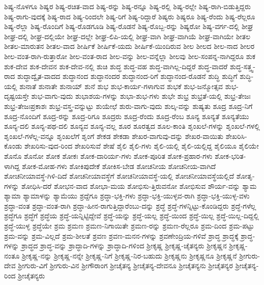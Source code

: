 {ಶಿಷ್ಯ-ನೊಳಗೂ
ಶಿಷ್ಯರ
ಶಿಷ್ಯ-ರಚಿತ-ವಾದ
ಶಿಷ್ಯ-ರನ್ನು
ಶಿಷ್ಯ-ರನ್ನೂ
ಶಿಷ್ಯ-ರಲ್ಲಿ
ಶಿಷ್ಯ-ರಲ್ಲೇ
ಶಿಷ್ಯ-ರಾಗಿ-ಬಿಡುತ್ತಿದ್ದರು
ಶಿಷ್ಯ-ರಾಗು-ವುದಕ್ಕೆ
ಶಿಷ್ಯ-ರಾದ
ಶಿಷ್ಯ-ರಿಂದಲೇ
ಶಿಷ್ಯ-ರಿಗೆ
ಶಿಷ್ಯ-ರಿದ್ದಾರೆ
ಶಿಷ್ಯರು
ಶಿಷ್ಯರೂ
ಶಿಷ್ಯ-ರೆಂದು
ಶಿಷ್ಯ-ರೆಲ್ಲರೂ
ಶಿಷ್ಯ-ರೆಲ್ಲಾ
ಶಿಷ್ಯ-ರೊಂದಿಗೆ
ಶಿಷ್ಯ-ರೊಡಗೂಡಿ
ಶಿಷ್ಯ-ರೊಡನೆ
ಶಿಷ್ಯ-ರೊಬ್ಬ-ರನ್ನು
ಶಿಷ್ಯರೋ
ಶಿಷ್ಯ-ವರ್ಗ-ದಲ್ಲಿ
ಶೀಘ್ರ
ಶೀಘ್ರ-ದಲ್ಲಿ
ಶೀಘ್ರ-ದಲ್ಲಿಯೇ
ಶೀಘ್ರ-ದಲ್ಲೇ
ಶೀಘ್ರ-ಲಿಪಿ-ಯಲ್ಲಿ
ಶೀಘ್ರ-ವಾಗಿ
ಶೀಘ್ರ-ವಾಗಿಯೆ
ಶೀಘ್ರ-ವಾಗಿಯೇ
ಶೀತಲ
ಶೀತಲ-ಮಾರುತನ
ಶೀತಲ-ವಾದ
ಶೀರ್ಷಿಕೆ
ಶೀರ್ಷಿಕೆ-ಯದು
ಶೀರ್ಷಿಕೆ-ಯಿಂದಿರುವ
ಶೀಲ
ಶೀಲದ
ಶೀಲ-ನಾದ
ಶೀಲರ
ಶೀಲ-ವಂತ-ರಾಗಿ-ರುತ್ತಾರೋ
ಶೀಲ-ವಂತ-ರಾದ
ಶೀಲ-ವನ್ನು
ಶೀಲ-ವನ್ನೆಲ್ಲಾ
ಶೀಲವು
ಶೀಲ-ಸಂಪನ್ನ-ನಾಗಿದ್ದರೂ
ಶುಕ
ಶುಕ-ದೇವ
ಶುಕ-ದೇವನ
ಶುಕ-ದೇವ-ನಲ್ಲಿ
ಶುಚಿ
ಶುದ್ಧ
ಶುದ್ಧ-ವಹ
ಶುದ್ಧ-ವಾಗಿಲ್ಲ-ದಿದ್ದರೆ
ಶುದ್ಧ-ವಾದರೆ
ಶುದ್ಧ-ಸತ್ತ್ವ-ರಾದ
ಶುದ್ಧಾದ್ವೈತ-ವಾದದ
ಶುದ್ಧಾನಂದ
ಶುದ್ಧಾನಂದರ
ಶುದ್ಧಾನಂದ-ರಿಗೆ
ಶುದ್ಧಾನಂದ-ರೊಡನೆ
ಶುದ್ಧಿ
ಶುದ್ಧಿಗೆ
ಶುದ್ಧಿ-ಯಲ್ಲಿ
ಶುನಾತೆ
ಶುನಾತೇ
ಶುನಾಯ್
ಶುನೆ
ಶುಭ
ಶುಭ-ಕಾರ್ಯ-ಗಳಾಗುವ
ಶುಭಕೆ
ಶುಭ-ಜನ್ಮೋತ್ಸವ
ಶುಭ-ದೃಷ್ಟಯಸ್ತೇ
ಶುಭ-ವಾಗು-ವುದು
ಶುಭಾಶಯ-ಗಳನ್ನು
ಶುಭಾ-ಶುಭ-ಗಳು
ಶುಭೇ
ಶುಭ್ರ
ಶುಭ್ರತೆ-ಯಲ್ಲಿ
ಶುಭ್ರ-ತೇಜಃ
ಶುಭ್ರ-ತೇಜಃಪ್ರಕಾಶಃ
ಶುಭ್ರ-ವಸ್ತ್ರ-ವನ್ನುಟ್ಟು
ಶುಯೇಛೆ
ಶುರು-ವಾಗು-ವುದು
ಶುಲ್ಕ-ವನ್ನು
ಶುಷ್ಯತು
ಶೂದ್ರ
ಶೂದ್ರ-ನಿಗೆ
ಶೂದ್ರ-ನೊಂದಿಗೆ
ಶೂದ್ರ-ರನ್ನು
ಶೂದ್ರ-ರಿಗೂ
ಶೂದ್ರರು
ಶೂದ್ರ-ರೆಂದು
ಶೂದ್ರ-ರೆಂಬ
ಶೂನ್ಯ
ಶೂನ್ಯತೆ
ಶೂನ್ಯತೆಯು
ಶೂನ್ಯ-ದಲಿ
ಶೂನ್ಯ-ಪಥ-ದಲಿ
ಶೂನ್ಯವ
ಶೂನ್ಯ-ವಲ್ಲ
ಶೂರ
ಶೂರತ್ವದ
ಶೂಲ-ಕಾಂತಿ
ಶೃಂಖಲೆ-ಗಳನ್ನು
ಶೃಂಖಲೆ-ಗಳಲ್ಲಿ
ಶೃಂಖಲೆ-ಗಳೆಲ್ಲ-ವನ್ನೂ
ಶೃಂಖಲೆಗೆ
ಶೃಂಗೆ
ಶೇಕಡ
ಶೇಕಡಾ
ಶೇಖರ-ವಾಗುವು-ದನ್ನು
ಶೇಖರ-ವಾಯಿತು
ಶೇಖರಿಸಿ-ಕೊಂಡು
ಶೇಖರಿಸು-ವುದ-ರಿಂದ
ಶೇಖರಿಸುವೆ
ಶೇಷೆ
ಶೈಲಿ
ಶೈಲಿ-ಗಳು
ಶೈಲಿ-ಯಲ್ಲಿ
ಶೈಲಿ-ಯಲ್ಲಿದ್ದ
ಶೈಲಿಯೂ
ಶೈಲಿಯೇ
ಶೊನೊ
ಶೊನೋ
ಶೋಕ
ಶೋಕಃ
ಶೋಕ-ದಾರಿರ್ಯ-ಗಳು
ಶೋಕ-ಪೂರಿತ
ಶೋಕ-ಪ್ರಹಾರ-ಗಳು
ಶೋಕ-ಭರಿತ-ಳಾಗಿದ್ದ
ಶೋಕ-ಮೋಹ-ಗಳು
ಶೋಕಿಪುದೇಕೆ
ಶೋಕಿಸ-ಬೇಡ
ಶೋಚನೀಯ
ಶೋಚನೀಯ-ವಾಗಿದೆ
ಶೋಚನೀಯಾವಸ್ಥೆ-ಗಿಳಿ-ದಿದೆ
ಶೋಚನೀಯಾವಸ್ಥೆಗೆ
ಶೋಚನೀಯಾವಸ್ಥೆ-ಯಲ್ಲಿ
ಶೋಚನೀಯಾವಸ್ಥೆಯಲ್ಲಿದೆ
ಶೋತೃ-ಗಳನ್ನು
ಶೋಧಿಸಿ-ದರೆ
ಶೋಭನ-ವಾದ
ಶೋಭಾ-ಮಯ
ಶೋಭಿಸು-ತ್ತಿರುವನೋ
ಶೋಭಿಸುವ
ಶೌರ್ಯ-ವನ್ನು
ಶ್ಯಾಮ
ಶ್ಯಾಮಾ
ಶ್ಯಾಮಾಳನ್ನು
ಶ್ಯಾಮೆಯು
ಶ್ರದ್ದೆಗೂ
ಶ್ರದ್ಧಾ-ಭಕ್ತಿ-ಗಳು
ಶ್ರದ್ಧಾ-ಭಕ್ತಿ-ಯುಳ್ಳವ-ರಾಗಿ
ಶ್ರದ್ಧಾ-ಭಕ್ತಿ-ಯುಳ್ಳ-ವಳು
ಶ್ರದ್ಧಾ-ವಂತ
ಶ್ರದ್ಧಾ-ವಂತ-ರಾಗಿ
ಶ್ರದ್ಧಾ-ಹೀನ-ರಾಗುತ್ತಿದ್ದಾರೆಂಬು-ದನ್ನು
ಶ್ರದ್ಧೆ
ಶ್ರದ್ಧೆ-ಗಳನ್ನಿಟ್ಟು-ಕೊಂಡಿದ್ದರು
ಶ್ರದ್ಧೆ-ಗಳೆಲ್ಲ
ಶ್ರದ್ಧೆಗೂ
ಶ್ರದ್ಧೆಗೆ
ಶ್ರದ್ಧೆಯ
ಶ್ರದ್ಧೆ-ಯನ್ನಿಟ್ಟಿದ್ದೇವೆ
ಶ್ರದ್ಧೆ-ಯನ್ನು
ಶ್ರದ್ಧೆ-ಯಲ್ಲ
ಶ್ರದ್ಧೆ-ಯಿಂದ
ಶ್ರದ್ಧೆ-ಯಿಲ್ಲ
ಶ್ರದ್ಧೆ-ಯಿಲ್ಲ-ದಿದ್ದಲ್ಲಿ
ಶ್ರದ್ಧೆ-ಯುಳ್ಳ
ಶ್ರದ್ಧೆಯೇ
ಶ್ರಮ
ಶ್ರಮಣ
ಶ್ರಮಣ-ನಿಗಾಯಿತೇ
ಶ್ರಮಣ-ರನ್ನು
ಶ್ರಮಣ-ರೆಲ್ಲರೂ
ಶ್ರಮ-ದಿಂದ
ಶ್ರಮ-ಪಟ್ಟು
ಶ್ರಮ-ವನ್ನು
ಶ್ರಮ-ವಿಲ್ಲದೆ
ಶ್ರಮ-ಶೀಲತೆ
ಶ್ರವಣ
ಶ್ರವಣ-ಮನನ-ಗಳನ್ನು
ಶ್ರವಣೇಂದ್ರಿಯ-ಗಳಿವೆ
ಶ್ರಾದ್ಧ
ಶ್ರಾದ್ಧಕ್ಕೆ
ಶ್ರಾದ್ಧ-ಗಳನ್ನು
ಶ್ರಾದ್ಧದ
ಶ್ರಾದ್ಧ-ವನ್ನು
ಶ್ರಾದ್ಧಾದಿ-ಗಳನ್ನು
ಶ್ರಾದ್ಧಾದಿ-ಗಳಿಂದ
ಶ್ರೀಕೃಷ್ಣ
ಶ್ರೀಕೃಷ್ಣ-ಚೈತನ್ಯರು
ಶ್ರೀಕೃಷ್ಣನ
ಶ್ರೀಕೃಷ್ಣ-ನಂತೂ
ಶ್ರೀಕೃಷ್ಣ-ನನ್ನು
ಶ್ರೀಕೃಷ್ಣ-ನನ್ನೇ
ಶ್ರೀಕೃಷ್ಣ-ನಿಗೆ
ಶ್ರೀಕೃಷ್ಣ-ನಿರ-ಬಹುದು
ಶ್ರೀಕೃಷ್ಣನು
ಶ್ರೀಕೃಷ್ಣನೂ
ಶ್ರೀಕೃಷ್ಣನೆ
ಶ್ರೀಗುರು-ದೇವ
ಶ್ರೀಗುರು-ವಿಗೆ
ಶ್ರೀಗುರು-ವಿನ
ಶ್ರೀಗೌರಾಂಗ
ಶ್ರೀಚೈತನ್ಯ
ಶ್ರೀಚೈತನ್ಯ-ದೇವನೂ
ಶ್ರೀಚೈತನ್ಯನು
ಶ್ರೀಚೈತನ್ಯರ
ಶ್ರೀಚೈತನ್ಯ-ರಿಂದ
ಶ್ರೀಚೈತನ್ಯರು
}
